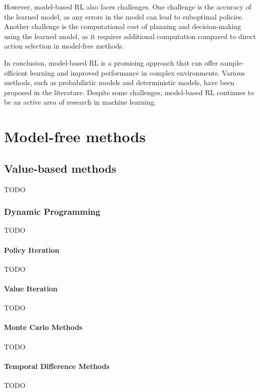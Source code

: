 \documentclass[../xlapes02]{subfiles}
\begin{document}
    However, model-based RL also faces challenges. One challenge is the accuracy of the learned model, as any errors in the model can lead to suboptimal policies. Another challenge is the computational cost of planning and decision-making using the learned model, as it requires additional computation compared to direct action selection in model-free methods.

    In conclusion, model-based RL is a promising approach that can offer sample-efficient learning and improved performance in complex environments. Various methods, such as probabilistic models and deterministic models, have been proposed in the literature. Despite some challenges, model-based RL continues to be an active area of research in machine learning.


    \section{Model-free methods}\label{sec:model-free-methods}

    \subsection{Value-based methods}\label{subsec:value-based-methods}
    TODO

    \subsubsection{Dynamic Programming}\label{subsubsec:dynamic-programming}
    TODO

    \paragraph{Policy Iteration}\label{par:policy-iteration}
    TODO

    \paragraph{Value Iteration}\label{par:value-iteration}
    TODO

    \paragraph{Monte Carlo Methods}\label{par:monte-carlo-methods}
    TODO

    \paragraph{Temporal Difference Methods}\label{par:temporal-difference-methods}
    TODO
\end{document}
